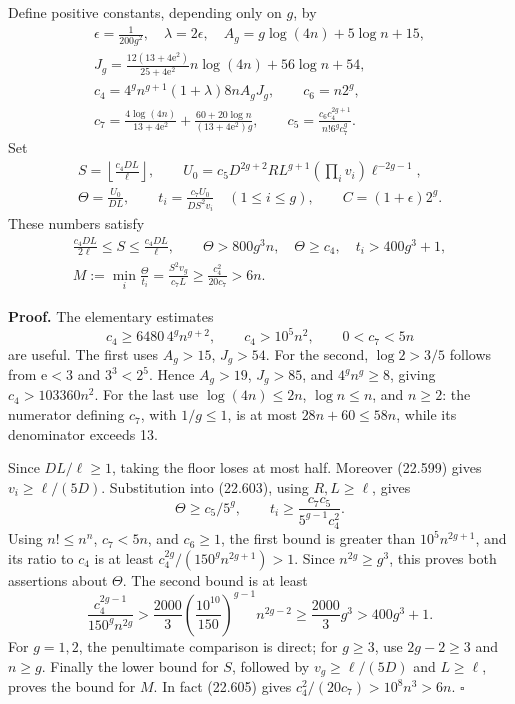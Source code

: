 \documentclass[
  11pt,
  a4paper,
]{article}
\begin{document}
Define positive constants, depending only on \(g\), by \[
\begin{gathered}
 \epsilon=\frac1{200g^2},\quad \lambda=2\epsilon,\quad
 A_g=g\log(4n)+5\log n+15,\\
 J_g=\frac{12(13+4\mathrm e^2)}{25+4\mathrm e^2}
                  n\log(4n)+56\log n+54,\\
 c_4=4^g n^{g+1}(1+\lambda)8n A_gJ_g,\qquad c_6=n2^g,\\
 c_7=\frac{4\log(4n)}{13+4\mathrm e^2}
          +\frac{60+20\log n}{(13+4\mathrm e^2)g},\qquad
 c_5=\frac{c_6c_4^{2g+1}}{n!6^gc_7^g}.
\end{gathered}
\tag{22.602}
\] Set \[
\begin{gathered}
 S=\left\lfloor\frac{c_4DL}{\ell}\right\rfloor,\qquad
 U_0=c_5D^{2g+2}RL^{g+1}\left(\prod_i v_i\right)\ell^{-2g-1},\\
 \Theta=\frac{U_0}{DL},\qquad
 t_i=\frac{c_7U_0}{DS^2v_i}\quad(1\le i\le g),\qquad
 C=(1+\epsilon)2^g.
\end{gathered}
\tag{22.603}
\] These numbers satisfy \[
\begin{gathered}
 \frac{c_4DL}{2\ell}\le S\le\frac{c_4DL}{\ell},\qquad
 \Theta>800g^3n,\quad \Theta\ge c_4,\quad t_i>400g^3+1,\\
 M:=\min_i\frac{\Theta}{t_i}
       =\frac{S^2v_g}{c_7L}\ge\frac{c_4^2}{20c_7}>6n.
\end{gathered}
\tag{22.604}
\]

\textbf{Proof.} The elementary estimates \[
 c_4\ge6480\,4^gn^{g+2},\qquad c_4>10^5n^2,
 \qquad 0<c_7<5n
 \tag{22.605}
\] are useful. The first uses \(A_g>15\), \(J_g>54\). For the second,
\(\log2>3/5\) follows from \(\mathrm e<3\) and \(3^3<2^5\). Hence
\(A_g>19\), \(J_g>85\), and \(4^gn^g\ge8\), giving \(c_4>103360n^2\).
For the last use \(\log(4n)\le2n\), \(\log n\le n\), and \(n\ge2\): the
numerator defining \(c_7\), with \(1/g\le1\), is at most
\(28n+60\le58n\), while its denominator exceeds 13.

Since \(DL/\ell\ge1\), taking the floor loses at most half. Moreover
(22.599) gives \(v_i\ge\ell/(5D)\). Substitution into (22.603), using
\(R,L\ge\ell\), gives \[
 \Theta\ge c_5/5^g,\qquad
 t_i\ge\frac{c_7c_5}{5^{g-1}c_4^2}.
 \tag{22.606}
\] Using \(n!\le n^n\), \(c_7<5n\), and \(c_6\ge1\), the first bound is
greater than \(10^5n^{2g+1}\), and its ratio to \(c_4\) is at least
\(c_4^{2g}/(150^gn^{2g+1})>1\). Since \(n^{2g}\ge g^3\), this proves
both assertions about \(\Theta\). The second bound is at least \[
 \frac{c_4^{2g-1}}{150^gn^{2g}}
 >\frac{2000}{3}\left(\frac{10^{10}}{150}\right)^{g-1}
          n^{2g-2}\ge\frac{2000}{3}g^3>400g^3+1.
 \tag{22.607}
\] For \(g=1,2\), the penultimate comparison is direct; for \(g\ge3\),
use \(2g-2\ge3\) and \(n\ge g\). Finally the lower bound for \(S\),
followed by \(v_g\ge\ell/(5D)\) and \(L\ge\ell\), proves the bound for
\(M\). In fact (22.605) gives \(c_4^2/(20c_7)>10^8n^3>6n\). \(\square\)
\end{document}
